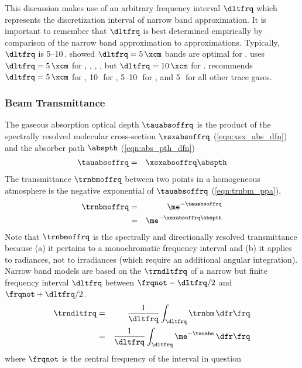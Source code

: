 \documentclass[12pt]{article}
\begin{document}
This discussion makes use of an arbitrary frequency 
interval $\dltfrq$ which represents the discretization interval of  
narrow band approximation.
It is important to remember that $\dltfrq$ is best determined
empirically by comparison of the narrow band approximation to
 approximations.
Typically, $\dltfrq$ is 5--10\,\xcm.
\cite{KiR83} showed $\dltfrq = 5\,\xcm$ bands are optimal for \COd. 
\cite{Bri922} uses $\dltfrq = 5\,\xcm$ for \COd, \Ot, \CHq, \NdO, but
$\dltfrq = 10\,\xcm$ for \HdO. 
\cite{Kie97} recommends $\dltfrq = 5\,\xcm$ for \COd, 10\,\xcm\ for
\HdO, 5--10\,\xcm\ for \Ot, and 5\,\xcm\ for all other trace gases. 

\subsubsection[Beam Transmittance]{Beam Transmittance}\label{sxn:trnbm}
The gaseous absorption optical depth $\tauabsoffrq$ is the product of
the spectrally resolved molecular cross-section $\xsxabsoffrq$
(\ref{eqn:xsx_abs_dfn}) and the absorber path $\abspth$
(\ref{eqn:abs_pth_dfn}) 
\begin{eqnarray}
\tauabsoffrq & = & \xsxabsoffrq \abspth
\label{eqn:tau_abs_mlk_dfn}
\end{eqnarray}
The transmittance $\trnbmoffrq$ between two points in a homogeneous
atmosphere is the negative exponential of $\tauabsoffrq$
(\ref{eqn:trnbm_ppa}),  
\begin{eqnarray}
\trnbmoffrq & = & \me^{-\tauabsoffrq} \nonumber \\
& = & \me^{-\xsxabsoffrq \abspth}
\label{eqn:trnbm_ppa2}
\end{eqnarray}
Note that $\trnbmoffrq$ is the spectrally and directionally resolved 
transmittance because (a) it pertains to a monochromatic frequency
interval and (b) it applies to radiances, not to irradiances 
(which require an additional angular integration).
Narrow band models are based on the 
$\trndltfrq$ of a narrow but finite frequency interval $\dltfrq$
between $\frqnot-\dltfrq/2$ and $\frqnot+\dltfrq/2$.
\begin{eqnarray}
\trndltfrq & = & \frac{1}{\dltfrq} \int_{\dltfrq} \trnbm \,\dfr\frq \nonumber \\  
& = & \frac{1}{\dltfrq} \int_{\dltfrq} \me^{-\tauabs} \,\dfr\frq
\label{eqn:trn_dlt_frq_dfn}
\end{eqnarray}
where $\frqnot$ is the central frequency of the interval in question
\end{document}
